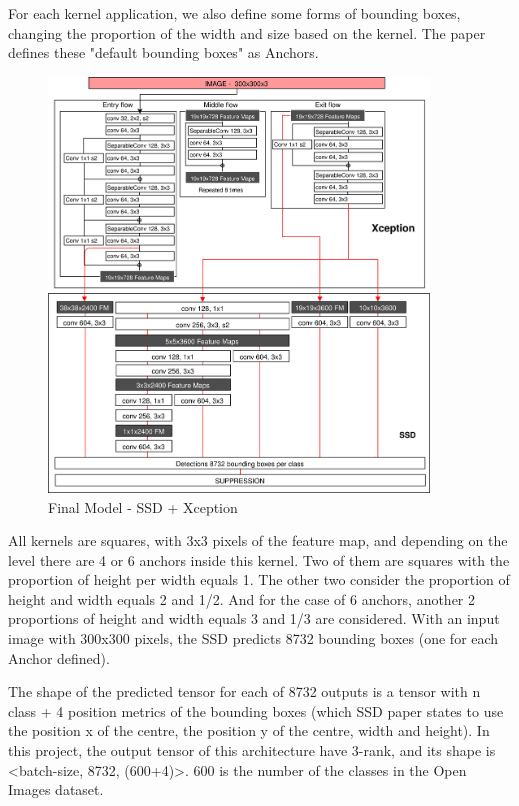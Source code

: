 \documentclass[11pt, a4paper, twocolumn]{article}
\begin{document}
For each kernel application, we also define some forms of bounding boxes, changing the proportion of the width and size based on the kernel. The paper defines these "default bounding boxes" as Anchors.

\begin{figure}[!ht]
	\centering
	\includegraphics[width=0.9\textwidth]{xception+ssd.jpg}
	\caption{\scriptsize Final Model - SSD + Xception}
	\label{architecture}
\end{figure}

All kernels are squares, with 3x3 pixels of the feature map, and depending on the level there are 4 or 6 anchors inside this kernel. Two of them are squares with the proportion of height per width equals 1. The other two consider the proportion of height and width equals 2 and 1/2. And for the case of 6 anchors, another 2 proportions of height and width equals 3 and 1/3 are considered. With an input image with 300x300 pixels, the SSD predicts 8732 bounding boxes (one for each Anchor defined).

The shape of the predicted tensor for each of 8732 outputs is a tensor with n class + 4 position metrics of the bounding boxes (which SSD paper states to use the position x of the centre, the position y of the centre, width and height). In this project, the output tensor of this architecture have 3-rank, and its shape is <batch-size, 8732, (600+4)>. 600 is the number of the classes in the Open Images dataset.
\end{document}
